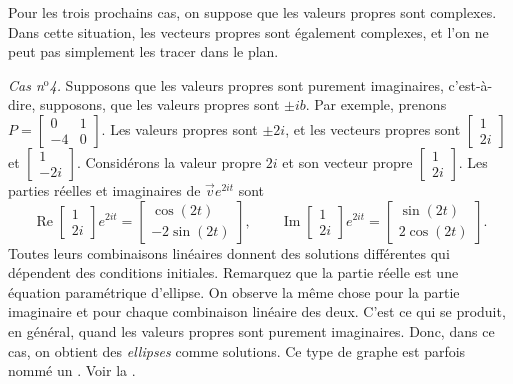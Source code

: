 \medskip

\pagebreak[0]
Pour les trois prochains cas, on suppose que les valeurs propres sont complexes. Dans cette situation, les vecteurs propres sont également complexes, et l'on ne peut pas simplement les tracer dans le plan.

\medskip

\pagebreak[0]
\emph{Cas n$^\text{o}$4.} Supposons que les valeurs propres sont purement imaginaires, c'est-à-dire, supposons, que les valeurs propres sont $\pm ib$. Par exemple, prenons $P = 
\left[ \begin{smallmatrix} 0 & 1 \\ -4 & 0 \end{smallmatrix} \right]$.
Les valeurs propres sont $\pm 2i$, et les vecteurs propres sont
$\left[ \begin{smallmatrix} 1 \\ 2i \end{smallmatrix} \right]$ et
$\left[ \begin{smallmatrix} 1 \\ -2i \end{smallmatrix} \right]$. Considérons la valeur propre $2i$ et son vecteur propre
$\left[ \begin{smallmatrix} 1 \\ 2i \end{smallmatrix} \right]$.
Les parties réelles et imaginaires de $\vec{v} e^{2it}$ sont
\begin{equation*}
\operatorname{Re}
\begin{bmatrix} 1 \\ 2i \end{bmatrix} e^{2it} =
\begin{bmatrix} \cos (2t) \\ -2 \sin (2t) \end{bmatrix} ,
\qquad
\operatorname{Im}
\begin{bmatrix} 1 \\ 2i \end{bmatrix} e^{2it} =
\begin{bmatrix} \sin (2t) \\ 2 \cos (2t) \end{bmatrix} .
\end{equation*}
Toutes leurs combinaisons linéaires donnent des solutions différentes qui dépendent des conditions initiales. Remarquez que la partie réelle est une équation paramétrique d'ellipse. On observe la même chose pour la partie imaginaire et pour chaque combinaison linéaire des deux. C'est ce qui se produit, en général, quand les valeurs propres sont purement imaginaires. Donc, dans ce cas, on obtient des \emph{ellipses} comme solutions. Ce type de graphe est parfois nommé un \emph{}. Voir la .

